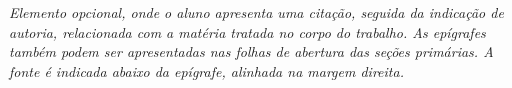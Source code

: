 \begin{epigrafe}
    \vspace*{\fill}
	\begin{flushright}
		\textit{Elemento opcional, onde o aluno apresenta uma citação, seguida da indicação de autoria, relacionada com a matéria tratada no corpo do trabalho. As epígrafes também podem ser apresentadas nas folhas de abertura das seções primárias. A fonte é indicada abaixo da epígrafe, alinhada na margem direita.}
	\end{flushright}
\end{epigrafe}